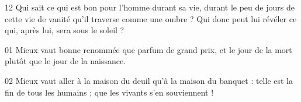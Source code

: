 
12 Qui sait ce qui est bon pour l’homme durant sa vie, durant le peu de jours de cette vie de vanité qu’il traverse comme une ombre ? Qui donc peut lui révéler ce qui, après lui, sera sous le soleil ?

01 Mieux vaut bonne renommée que parfum de grand prix, et le jour de la mort plutôt que le jour de la naissance.

02 Mieux vaut aller à la maison du deuil qu’à la maison du banquet : telle est la fin de tous les humains ; que les vivants s’en souviennent !

